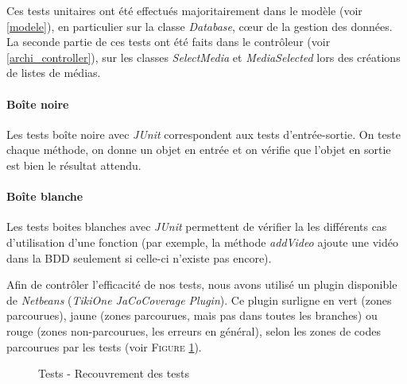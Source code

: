 Ces tests unitaires ont été effectués majoritairement dans le modèle (voir \ref{modele}), en particulier sur la classe \textit{Database}, cœur de la gestion des données. La seconde partie de ces tests ont été faits dans le contrôleur (voir \ref{archi_controller}), sur les classes \textit{SelectMedia} et \textit{MediaSelected} lors des créations de listes de médias.

\paragraph{Boîte noire}

Les tests boîte noire avec \textit{JUnit} correspondent aux tests d'entrée-sortie. On teste chaque méthode, on donne un objet en entrée et on vérifie que l'objet en sortie est bien le résultat attendu.

\paragraph{Boîte blanche}

Les tests boites blanches avec \textit{JUnit} permettent de vérifier la les différents cas d'utilisation d'une fonction (par exemple, la méthode \textit{addVideo} ajoute une vidéo dans la BDD seulement si celle-ci n'existe pas encore).


Afin de contrôler l'efficacité de nos tests, nous avons utilisé un plugin disponible de \textit{Netbeans} (\textit{TikiOne JaCoCoverage Plugin}). Ce plugin surligne en vert (zones parcourues), jaune (zones parcourues, mais pas dans toutes les branches) ou rouge (zones non-parcourues, les erreurs en général), selon les zones de codes parcourues par les tests (voir \textsc{Figure} \ref{cocojava}).

\begin{figure}[!ht]
\begin{center}
  \caption{Tests - Recouvrement des tests}
  \label{cocojava} 
\end{center}
\end{figure}


